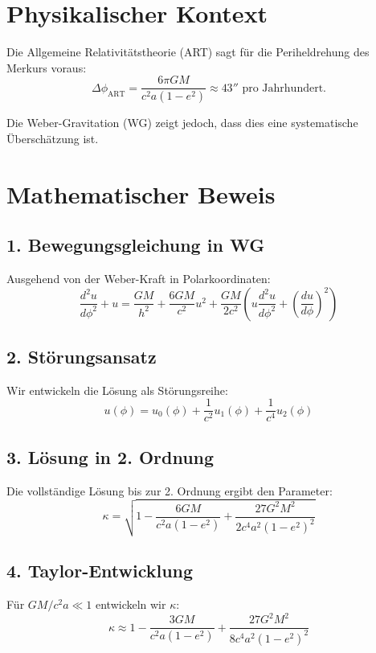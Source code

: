 \section{Physikalischer Kontext}
Die Allgemeine Relativitätstheorie (ART) sagt für die Periheldrehung des Merkurs voraus:
\[ \Delta\phi_{\text{ART}} = \frac{6\pi GM}{c^2 a(1-e^2)} \approx 43'' \text{ pro Jahrhundert.} \]

Die Weber-Gravitation (WG) zeigt jedoch, dass dies eine systematische Überschätzung ist.

\section*{Mathematischer Beweis}

\subsection*{1. Bewegungsgleichung in WG}
Ausgehend von der Weber-Kraft in Polarkoordinaten:
\begin{equation}
\frac{d^2u}{d\phi^2} + u = \frac{GM}{h^2} + \frac{6GM}{c^2}u^2 + \frac{GM}{2c^2}\left(u\frac{d^2u}{d\phi^2} + \left(\frac{du}{d\phi}\right)^2\right)
\end{equation}

\subsection*{2. Störungsansatz}
Wir entwickeln die Lösung als Störungsreihe:
\[ u(\phi) = u_0(\phi) + \frac{1}{c^2}u_1(\phi) + \frac{1}{c^4}u_2(\phi) \]

\subsection*{3. Lösung in 2. Ordnung}
Die vollständige Lösung bis zur 2. Ordnung ergibt den Parameter:
\begin{equation}
\kappa = \sqrt{1 - \frac{6GM}{c^2 a(1-e^2)} + \frac{27G^2M^2}{2c^4 a^2(1-e^2)^2}}
\end{equation}

\subsection*{4. Taylor-Entwicklung}
Für $GM/c^2a \ll 1$ entwickeln wir $\kappa$:
\begin{equation}
\kappa \approx 1 - \frac{3GM}{c^2 a(1-e^2)} + \frac{27G^2M^2}{8c^4 a^2(1-e^2)^2}
\end{equation}

